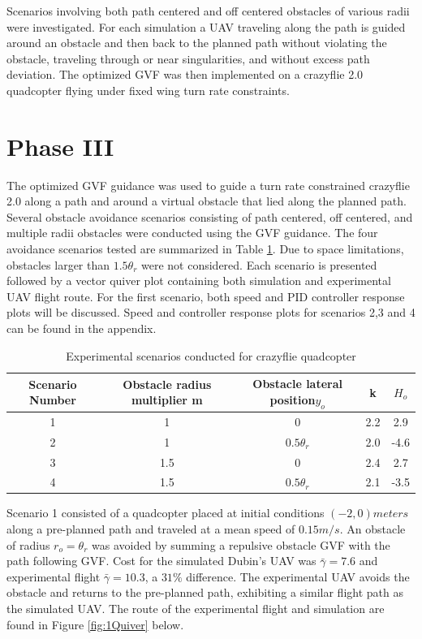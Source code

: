 \documentclass[numbered,pdftex]{ohio-etd}
\begin{document}
Scenarios involving both path centered and off centered obstacles of various radii were investigated. For each simulation a UAV traveling along the path is guided around an obstacle and then back to the planned path without violating the obstacle, traveling through or near singularities, and without excess path deviation. The optimized GVF was then implemented on a crazyflie 2.0 quadcopter flying under fixed wing turn rate constraints. 



\section{Phase III}

The optimized GVF guidance was used to guide a turn rate constrained crazyflie 2.0 along a path and around a virtual obstacle that lied along the planned path. Several obstacle avoidance scenarios consisting of path centered, off centered, and multiple radii obstacles were conducted using the GVF guidance. The four avoidance scenarios tested are summarized in Table \ref{table:flightScenarios}. Due to space limitations, obstacles larger than $1.5 \theta_r$ were not considered. Each scenario is presented followed by a vector quiver plot containing both simulation and experimental UAV flight route. For the first scenario, both speed and PID controller response plots will be discussed. Speed and controller response plots for scenarios 2,3 and 4 can be found in the appendix. 


\begin{table}[H]
	\centering
	\caption{Experimental scenarios conducted for crazyflie quadcopter}
	\label{table:flightScenarios}
	\begin{tabular}{|c|c|c|c|c|}
		\hline
		Scenario Number & Obstacle radius multiplier m   & Obstacle lateral position$y_o$             & k   & $H_o$ \\ \hline
		1               & 1   & 0              & 2.2 & 2.9   \\ \hline
		2               & 1   & $0.5 \theta_r$ & 2.0 & -4.6  \\ \hline
		3               & 1.5 & 0              & 2.4 & 2.7   \\ \hline
		4               & 1.5 & $0.5 \theta_r$ & 2.1 & -3.5  \\ \hline
	\end{tabular}
\end{table}


Scenario 1 consisted of a quadcopter placed at initial conditions $(-2,0) meters$ along a pre-planned path and traveled at a mean speed of $0.15 m/s$. An obstacle of radius $r_o = \theta_r$ was avoided by summing a repulsive obstacle GVF with the path following GVF. Cost for the simulated Dubin's UAV was $\bar{\gamma} = 7.6$ and experimental flight $\bar{\gamma} = 10.3$, a $31 \%$ difference. The experimental UAV avoids the obstacle and returns to the pre-planned path, exhibiting a similar flight path as the simulated UAV. The route of the experimental flight and simulation are found in Figure \ref{fig:1Quiver} below.
\end{document}
